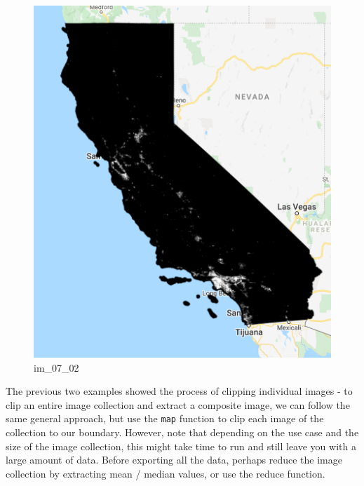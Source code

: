 \documentclass[
]{article}
\begin{document}
\begin{figure}
\centering
\includegraphics{./im/im_07_02.png}
\caption{im\_07\_02}
\end{figure}

The previous two examples showed the process of clipping individual images - to clip an entire image collection and extract a composite image, we can follow the same general approach, but use the \texttt{map} function to clip each image of the collection to our boundary. However, note that depending on the use case and the size of the image collection, this might take time to run and still leave you with a large amount of data. Before exporting all the data, perhaps reduce the image collection by extracting mean / median values, or use the reduce function.
\end{document}
